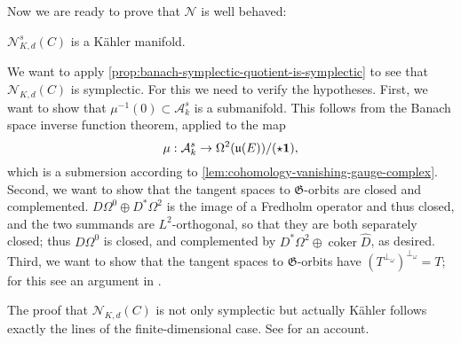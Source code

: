 \documentclass[12pt,letterpaper,reqno]{article}
\numberwithin{equation}{section}
\newcommand{\fu}{{\mathfrak u}}
\newcommand{\fG}{{\mathfrak G}}
\newcommand{\cN}{\ensuremath{\mathcal N}}
\newcommand{\cA}{\ensuremath{\mathcal A}}
\newcommand{\kahler}{K\"ahler\xspace}
\DeclareMathOperator{\coker}{coker}
\begin{document}
Now we are ready to prove that $\cN$ is well behaved:
\begin{thm}[$\cN^s_{K,d}(C)$ is \kahler] \label{thm:N-is-kahler}
$\cN^s_{K,d}(C)$ is a \kahler manifold.
\end{thm}
\begin{pf}
We want to apply
\autoref{prop:banach-symplectic-quotient-is-symplectic}
to see that $\cN_{K,d}(C)$ is symplectic.
For this we need to verify the hypotheses.
First, we want
to show that $\mu^{-1}(0) \subset \cA^s_{k}$ is a submanifold.
This follows from the
Banach space inverse function theorem, applied to the map
\begin{equation}
\mu: \cA^s_k \to \Omega^2(\fu(E)) / (\star \bf 1),
\end{equation}
which is a submersion according to
\autoref{lem:cohomology-vanishing-gauge-complex}.
Second, we want to show that the tangent spaces to $\fG$-orbits are
closed and complemented.
$D \Omega^0 \oplus D^* \Omega^2$ is the image of
a Fredholm operator and thus closed, and the two summands
are $L^2$-orthogonal, so that they are both separately closed;
thus $D \Omega^0$ is closed, and complemented by
$D^* \Omega^2 \oplus \coker \hat{D}$, as desired.
Third, we want to show that the tangent spaces to $\fG$-orbits
have $(T^{\perp_\omega})^{\perp_\omega} = T$; for this
see an argument in \cite{MR909698}.

The proof that $\cN_{K,d}(C)$
is not only symplectic but actually
\kahler follows exactly the lines of the finite-dimensional
case. See \cite{Tumpach2007} for an account.
\end{pf}
\end{document}

